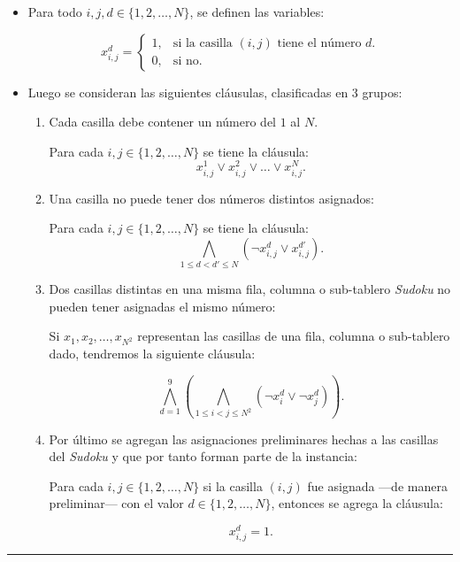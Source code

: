 \documentclass[12pt,lettersize,oneside]{article}
\begin{document}
\begin{itemize}
\item Para todo $i,j,d \in \{ 1,2,\ldots,N\}$, se definen las variables:

\[ x_{i,j}^d = \begin{cases} 1, & \mbox{si la casilla $(i,j)$ tiene el número
    $d$.} \\
    0, & \mbox{si no.} \end{cases}\]

\item Luego se consideran las siguientes cláusulas, clasificadas en 3 grupos:
\vspace{-2.5mm}

\begin{enumerate}
\item Cada casilla debe contener un número del $1$ al $N$.

     Para cada $i,j \in \{1,2,\ldots,N\}$ se tiene la cláusula:
       \[ x_{i,j}^1 \vee x_{i,j}^2 \vee \ldots \vee x_{i,j}^N.\]

\item Una casilla no puede tener dos números distintos asignados:

     Para cada $i,j \in \{1,2,\ldots,N\}$ se tiene la cláusula:
     \[ \bigwedge_{1\leq d < d' \leq N} (\neg x_{i,j}^d \vee x_{i,j}^{d'}).\]

\item Dos casillas distintas en una misma fila, columna o sub-tablero
  \emph{Sudoku} no pueden tener asignadas el mismo número:

     Si $x_1,x_2,\ldots, x_{N^2}$ representan las casillas de una fila, columna
     o sub-tablero dado, tendremos la siguiente cláusula:

     \[ \bigwedge_{d=1}^{9} \left( \bigwedge_{1\leq i < j \leq N^2}
       \left( \neg x_{i}^d \vee \neg x_{j}^{d} \right)\right).\]

\item Por último se agregan las asignaciones preliminares hechas a las casillas
  del \emph{Sudoku} y que por tanto forman parte de la instancia:

      Para cada $i,j \in \{1,2,\ldots, N\}$ si la casilla $(i,j)$ fue asignada
      ---de manera preliminar--- con el valor $d \in \{1,2,\ldots,N\}$, entonces
      se agrega la cláusula:

      \[ x_{i,j}^d= 1.\]
\end{enumerate}
\end{itemize}\vspace{-2.5mm}
\rule{4cm}{0.3mm}
\end{document}
